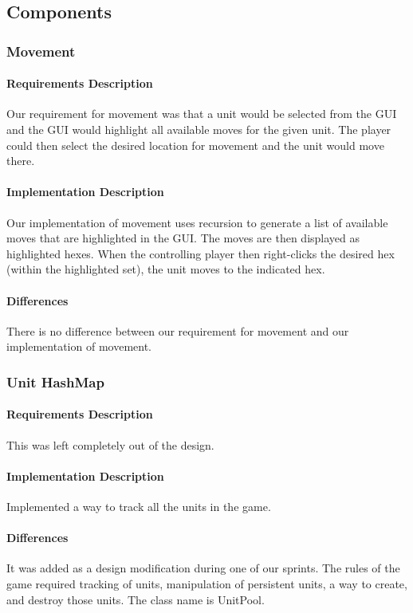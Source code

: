 \documentclass[12pt,a4paper,titlepage]{article}
\begin{document}
\subsection{Components}

\subsubsection{Movement}
\paragraph{Requirements Description} Our requirement for movement was that a unit would be selected from the GUI and the GUI would highlight all available moves for the given unit. The player could then select the desired location for movement and the unit would move there.
\paragraph{Implementation Description} Our implementation of movement uses recursion to generate a list of available moves that are highlighted in the GUI. The moves are then displayed as highlighted hexes. When the controlling player then right-clicks the desired hex (within the highlighted set), the unit moves to the indicated hex. 
\paragraph{Differences} There is no difference between our requirement for movement and our implementation of movement.

\subsubsection{Unit HashMap} 
\paragraph{Requirements Description} This was left completely out of the design. 
\paragraph{Implementation Description} Implemented a way to track all the units in the game.
\paragraph{Differences} It was added as a design modification during one of our sprints. The rules of the game required tracking of units, manipulation of persistent units, a way to create, and destroy those units. The class name is UnitPool.
\end{document}

